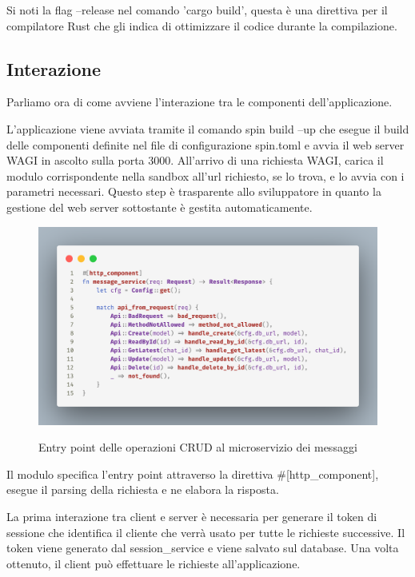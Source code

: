 Si noti la flag --release nel comando 'cargo build', questa è una direttiva per il compilatore Rust che gli indica di
ottimizzare il codice durante la compilazione.

\subsection{Interazione}
Parliamo ora di come avviene l'interazione tra le componenti dell'applicazione.

L'applicazione viene avviata tramite il comando spin build --up che esegue il build delle componenti definite nel file
di configurazione spin.toml e avvia il web server WAGI in ascolto sulla porta 3000. All'arrivo di una richiesta WAGI,
carica il modulo corrispondente nella sandbox all'url richiesto, se lo trova, e lo avvia con i parametri necessari.
Questo step è trasparente allo sviluppatore in quanto la gestione del web server sottostante è gestita automaticamente.

\begin{figure}[h]
    \centering
    \captionsetup{justification=centering}
    \includegraphics[width=15cm]{./chapters/3.poc/images/2.microservice_entrypoint.png}
    \label{fig:2.microservice_entrypoint}
    \caption{Entry point delle operazioni CRUD al microservizio dei messaggi}
\end{figure}

Il modulo specifica l'entry point attraverso la direttiva \#[http\_component], esegue il parsing della richiesta e ne
elabora la risposta.

La prima interazione tra client e server è necessaria per generare il token di sessione che identifica il cliente che
verrà usato per tutte le richieste successive. Il token viene generato dal session\_service e viene salvato sul
database. Una volta ottenuto, il client può effettuare le richieste all'applicazione.


